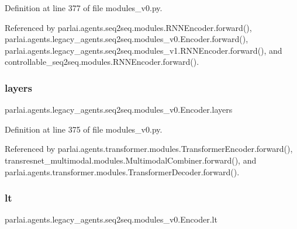 Definition at line 377 of file modules\+\_\+v0.\+py.



Referenced by parlai.\+agents.\+seq2seq.\+modules.\+R\+N\+N\+Encoder.\+forward(), parlai.\+agents.\+legacy\+\_\+agents.\+seq2seq.\+modules\+\_\+v0.\+Encoder.\+forward(), parlai.\+agents.\+legacy\+\_\+agents.\+seq2seq.\+modules\+\_\+v1.\+R\+N\+N\+Encoder.\+forward(), and controllable\+\_\+seq2seq.\+modules.\+R\+N\+N\+Encoder.\+forward().

\mbox{\label{classparlai_1_1agents_1_1legacy__agents_1_1seq2seq_1_1modules__v0_1_1Encoder_ade7bafa8cbfe35093ebb2813fad9b8e9}} 
\subsubsection{\texorpdfstring{layers}{layers}}
{\footnotesize\ttfamily parlai.\+agents.\+legacy\+\_\+agents.\+seq2seq.\+modules\+\_\+v0.\+Encoder.\+layers}



Definition at line 375 of file modules\+\_\+v0.\+py.



Referenced by parlai.\+agents.\+transformer.\+modules.\+Transformer\+Encoder.\+forward(), transresnet\+\_\+multimodal.\+modules.\+Multimodal\+Combiner.\+forward(), and parlai.\+agents.\+transformer.\+modules.\+Transformer\+Decoder.\+forward().

\mbox{\label{classparlai_1_1agents_1_1legacy__agents_1_1seq2seq_1_1modules__v0_1_1Encoder_a69293e2d89c3b6fc6ccfffaa80fb651b}} 
\subsubsection{\texorpdfstring{lt}{lt}}
{\footnotesize\ttfamily parlai.\+agents.\+legacy\+\_\+agents.\+seq2seq.\+modules\+\_\+v0.\+Encoder.\+lt}



